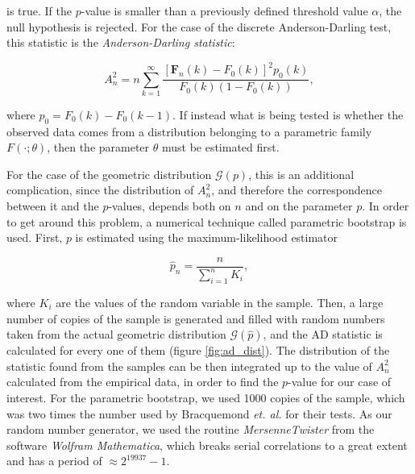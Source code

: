 \documentclass[a4paper]{jpconf}
\begin{document}
\begin{appendices}
\noindent
is true. If the $p$-value is smaller than a previously defined threshold value $\alpha$, the null hypothesis is rejected. For the case of the discrete Anderson-Darling test, this statistic is the {\it Anderson-Darling statistic}:

\begin{equation}
\label{eq_statistic}
A_n^2 = n\sum_{k=1}^{\infty}\frac{[\mathbf{F}_n(k) - F_0(k)]^2p_0(k)}{F_0(k)(1-F_0(k))},
\end{equation}

\noindent
where $p_0=F_0(k) - F_0(k-1)$. If instead what is being tested is whether the observed data comes from a distribution belonging to a parametric family $F(\cdot;\theta)$, then the parameter $\theta$ must be estimated first.

For the case of the geometric distribution $\mathcal{G}(p)$, this is an additional complication, since the distribution of $A_n^2$, and therefore the correspondence between it and the $p$-values, depends both on $n$ and on the parameter $p$. In order to get around this problem, a numerical technique called parametric bootstrap is used. First, $p$ is estimated using the maximum-likelihood estimator

\begin{equation}
\label{eq_maximum_likelihood}
\hat{p}_n=\frac{n}{\sum_{i=1}^n K_i},
\end{equation}

\noindent
where $K_i$ are the values of the random variable in the sample. Then, a large number of copies of the sample is  generated and filled with random numbers taken from the actual geometric distribution $\mathcal{G}(\hat{p})$, and the AD statistic is calculated for every one of them (figure \ref{fig:ad_dist}). The distribution of the statistic found from the samples can be then integrated up to the value of $A_n^2$ calculated from the empirical data, in order to find the $p$-value for our case of interest. For the parametric bootstrap,  we used 1000 copies of the sample, which was two times the number used by Bracquemond {\it et. al.} \cite{BraCreGau} for their tests. As our random number generator, we used the routine {\it MersenneTwister} from the software {\it Wolfram Mathematica}, which breaks serial correlations to a great extent and has a period of $\approx 2^{19937}-1$.


\end{appendices}
\end{document}
